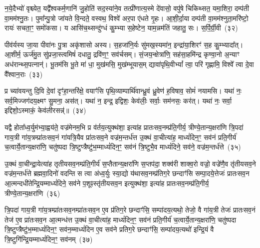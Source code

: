 न॒ये॒दैभ्यो॑ वृश्च्येत॒ यद्वै᳚श्वकर्म॒णानि॑ जु॒होति॑ सद॒स्या॑ने॒व तत्प्री॑णात्य॒स्मे दे॑वासो॒ वपु॑षे चिकिथ्सत॒ यमा॒शिरा॒ दम्प॑ती वा॒मम॑श्नु॒तः। पुमा᳚न्पु॒त्रो जा॑यते वि॒न्दते॒ वस्वथ॒ विश्वे॑ अर॒पा ए॑धते गृ॒हः। आ॒शी॒र्दा॒या दम्प॑ती वा॒मम॑श्नुता॒मरि॑ष्टो॒ रायः॑ सचता॒ꣳ॒ समो॑कसा। य आसि॑च॒थ्सन्दु॑ग्धं कु॒म्भ्या स॒हेष्टेन॒ याम॒न्नम॑तिं जहातु॒ सः। स॒र्पि॒र्ग्री॒वी~(३२)


पीव॑र्यस्य जा॒या पीवा॑नः पु॒त्रा अकृ॑शासो अस्य। स॒हजा॑नि॒र्यः सु॑मख॒स्यमा॑न॒ इन्द्रा॑या॒शिरꣳ॑ स॒ह कु॒म्भ्यादा᳚त्। आ॒शीर्म॒ ऊर्ज॑मु॒त सु॑प्रजा॒स्त्वमिषं॑ दधातु॒ द्रवि॑ण॒ꣳ॒ सव॑र्चसम्। सं॒जय॒न्क्षेत्रा॑णि॒ सह॑सा॒हमि॑न्द्र कृण्वा॒नो अ॒न्याꣳ अध॑रान्थ्स॒पत्नान्॑। भू॒तम॑सि भू॒ते मा॑ धा॒ मुख॑मसि॒ मुख॑म्भूयास॒म् द्यावा॑पृथि॒वी\-भ्यां᳚ त्वा॒ परि॑ गृह्णामि॒ विश्वे᳚ त्वा दे॒वा वै᳚श्वान॒राः~(३३)

प्र च्या॑वयन्तु दि॒वि दे॒वां दृꣳ॑हा॒न्तरि॑क्षे॒ वयाꣳ॑सि पृथि॒व्याम्पार्थि॑वान्ध्रु॒वं ध्रु॒वेण॑ ह॒विषाव॒ सोमं॑ नयामसि। यथा॑ नः॒ सर्व॒मिज्जग॑दय॒क्ष्मꣳ सु॒मना॒ अस॑त्। यथा॑ न॒ इन्द्र॒ इद्विशः॒ केव॑लीः॒ सर्वाः॒ सम॑नसः॒ कर॑त्। यथा॑ नः॒ सर्वा॒ इद्दिशो॒\-ऽस्माकं॒ केव॑लीरसन्न्॑॥~(३४)

{\anuvakamend[{एन॑सा विश्वकर्म॒न् यो दक्षि॑णां॒ न स॑र्पिर्ग्री॒वी वै᳚श्वान॒राश्च॑त्वारि॒ꣳ॒शच्च॑}]}%

यद्वै होता᳚ध्व॒र्युम॑भ्या॒ह्वय॑ते॒ वज्र॑मेनम॒भि प्र व॑र्तय॒त्युक्थ॑शा॒ इत्या॑ह प्रातःसव॒नम्प्र॑ति॒गीर्य॒ त्रीण्ये॒तान्य॒क्षरा॑णि त्रि॒पदा॑ गाय॒त्री गा॑य॒त्रम्प्रा॑तःसव॒नं गा॑यत्रि॒यैव प्रा॑तःसव॒ने वज्र॑म॒न्तर्ध॑त्त उ॒क्थं वा॒चीत्या॑ह॒ माध्यं॑दिन॒ꣳ॒ सव॑नं प्रति॒गीर्य॑ च॒त्वार्ये॒तान्य॒क्षरा॑णि॒ चतु॑ष्पदा त्रि॒ष्टुप्त्रैष्टु॑भ॒म्माध्यं॑दिन॒ꣳ॒ सव॑नं त्रि॒ष्टुभै॒व माध्यं॑दिने॒ सव॑ने॒ वज्र॑म॒न्तर्ध॑त्ते~(३५)

उ॒क्थं वा॒चीन्द्रा॒येत्या॑ह तृतीयसव॒नम्प्र॑ति॒गीर्य॑ स॒प्तैतान्य॒क्षरा॑णि स॒प्तप॑दा॒ शक्व॑री शाक्व॒रो वज्रो॒ वज्रे॑णै॒व तृ॑तीयसव॒ने वज्र॑म॒न्तर्ध॑त्ते ब्रह्मवा॒दिनो॑ वदन्ति स त्वा अ॑ध्व॒र्युः स्या॒द्यो य॑थासव॒नम्प्र॑तिग॒रे छन्दाꣳ॑सि सम्पा॒दये॒त्तेजः॑ प्रातःसव॒न आ॒त्मन्दधी॑तेन्द्रि॒यम्माध्यं॑दिने॒ सव॑ने प॒शूꣴस्तृ॑तीयसव॒न इत्युक्थ॑शा॒ इत्या॑ह प्रातःसव॒नम्प्र॑ति॒गीर्य॒ त्रीण्ये॒तान्य॒क्षरा॑णि~(३६)

त्रि॒पदा॑ गाय॒त्री गा॑य॒त्रम्प्रा॑तःसव॒नम्प्रा॑तःसव॒न ए॒व प्र॑तिग॒रे छन्दाꣳ॑सि॒ सम्पा॑दय॒त्यथो॒ तेजो॒ वै गा॑य॒त्री तेजः॑ प्रातःसव॒नं तेज॑ ए॒व प्रा॑तःसव॒न आ॒त्मन्ध॑त्त उ॒क्थं वा॒चीत्या॑ह॒ माध्यं॑दिन॒ꣳ॒ सव॑नं प्रति॒गीर्य॑ च॒त्वार्ये॒तान्य॒क्षरा॑णि॒ चतु॑ष्पदा त्रि॒ष्टुप्त्रैष्टु॑भ॒म्माध्यं॑दिन॒ꣳ॒ सव॑न॒म्माध्यं॑दिन ए॒व सव॑ने प्रतिग॒रे छन्दाꣳ॑सि॒ सम्पा॑दय॒त्यथो॑ इन्द्रि॒यं वै त्रि॒ष्टुगि॑न्द्रि॒यम्माध्यं॑दिन॒ꣳ॒ सव॑नम्~(३७)

